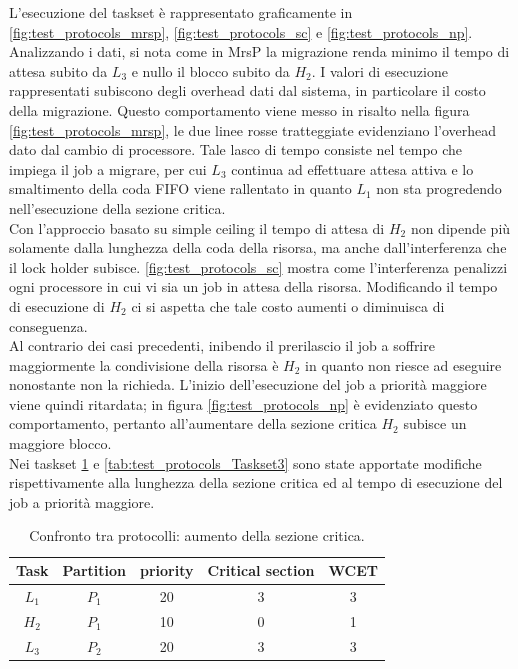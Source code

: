 \noindent L'esecuzione del taskset è rappresentato graficamente in \ref{fig:test_protocols_mrsp}, \ref{fig:test_protocols_sc} e \ref{fig:test_protocols_np}. Analizzando i dati, si nota come in MrsP la migrazione renda minimo il tempo di attesa subito da $L_3$ e nullo il blocco subito da $H_2$. I valori di esecuzione rappresentati subiscono degli overhead dati dal sistema, in particolare il costo della migrazione. Questo comportamento viene messo in risalto nella figura \ref{fig:test_protocols_mrsp}, le due linee rosse tratteggiate evidenziano l'overhead dato dal cambio di processore. Tale lasco di tempo consiste nel tempo che impiega il job a migrare, per cui $L_3$ continua ad effettuare attesa attiva e lo smaltimento della coda FIFO viene rallentato in quanto $L_1$ non sta progredendo nell'esecuzione della sezione critica.\\
Con l'approccio basato su simple ceiling il tempo di attesa di $H_2$ non dipende più solamente dalla lunghezza della coda della risorsa, ma anche dall'interferenza che il lock holder subisce. \ref{fig:test_protocols_sc} mostra come l'interferenza penalizzi ogni processore in cui vi sia un job in attesa della risorsa. Modificando il tempo di esecuzione di $H_2$ ci si aspetta che tale costo aumenti o diminuisca di conseguenza.\\
Al contrario dei casi precedenti, inibendo il prerilascio il job a soffrire maggiormente la condivisione della risorsa è $H_2$ in quanto non riesce ad eseguire nonostante non la richieda. L'inizio dell'esecuzione del job a priorità maggiore viene quindi ritardata; in figura \ref{fig:test_protocols_np} è evidenziato questo comportamento, pertanto all'aumentare della sezione critica $H_2$ subisce un maggiore blocco.\\

\noindent Nei taskset  \ref{tab:test_protocols_Taskset2} e \ref{tab:test_protocols_Taskset3} sono state apportate modifiche rispettivamente alla lunghezza della sezione critica ed al tempo di esecuzione del job a priorità maggiore.\\

\begin{table}
  \centering
  \begin{tabular}{ccccc}
  \hline\hline
    Task & Partition     & priority & Critical section & WCET  \\ \hline
    $L_1$ & $P_1$  & 20 & 3 & 3 \\
    $H_2$ & $P_1$  & 10 & 0 & 1 \\
    $L_3$ & $P_2$  & 20 & 3 & 3 \\
    \hline
    \end{tabular}
  \caption{Confronto tra protocolli: aumento della sezione critica.}
  \label{tab:test_protocols_Taskset2}
  \end{table}

